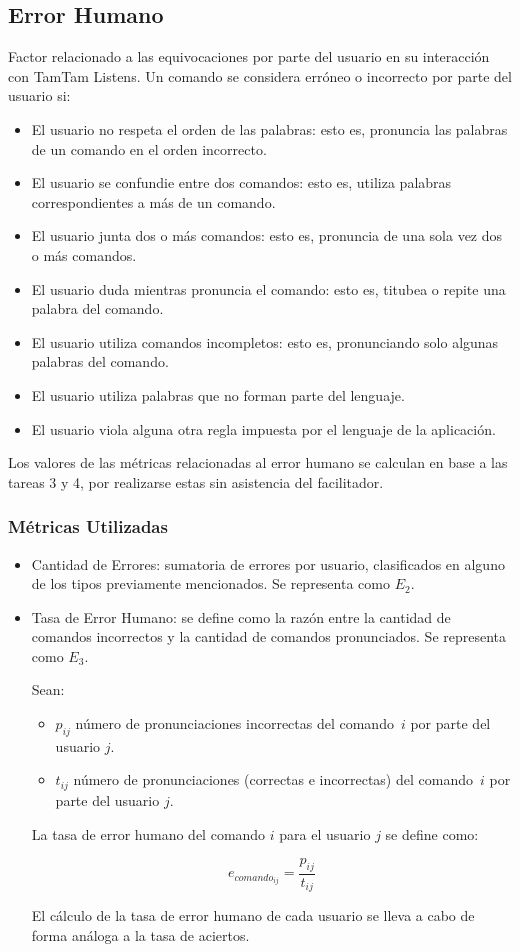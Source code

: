 \subsection{Error Humano}
Factor relacionado a las equivocaciones por parte del usuario en su interacci\'on con
TamTam Listens.
Un comando se considera err\'oneo o incorrecto por parte del usuario si:
\begin{itemize}
	\item El usuario no respeta el orden de las palabras: esto es, pronuncia las palabras de un comando en el orden incorrecto.
	\item El usuario se confundie entre dos comandos: esto es, utiliza palabras correspondientes a m\'as
	de un comando.
	\item El usuario junta dos o m\'as comandos: esto es, pronuncia de una sola vez dos o m\'as comandos.
	\item El usuario duda mientras pronuncia el comando: esto es, titubea o repite una palabra del comando.
	\item El usuario utiliza comandos incompletos: esto es, pronunciando solo algunas palabras del comando.
	\item El usuario utiliza palabras que no forman parte del lenguaje.
	\item El usuario viola alguna otra regla impuesta por el lenguaje de la aplicaci\'on.
\end{itemize}
Los valores de las m\'etricas relacionadas al error humano se calculan
en base a las tareas 3 y 4, por realizarse estas sin asistencia del facilitador. 

\subsubsection{M\'etricas Utilizadas}
\begin{itemize}
	\item Cantidad de Errores: sumatoria de errores por usuario, clasificados en
	alguno de los tipos previamente mencionados. Se representa como $E_2$.
	\item Tasa de Error Humano: se define como la raz\'on entre la cantidad de comandos incorrectos
	y la cantidad de comandos pronunciados. Se representa como $E_3$.
	
	Sean:

	\begin{itemize}
		\item $p_{ij}$ n\'umero de pronunciaciones incorrectas del \mbox{comando $i$} por parte del usuario $j$.
		\item $t_{ij}$ n\'umero de pronunciaciones (correctas e incorrectas) del \mbox{comando $i$} por parte del usuario $j$.
	\end{itemize}
	La tasa de error humano del comando $i$ para el usuario $j$ se define como: 

	\begin{equation*}
		e_{{comando}_{ij}}=\frac{p_{ij}}{t_{ij}}
	\end{equation*}

	El c\'alculo de la tasa de error humano de cada usuario se lleva a cabo de forma an\'aloga 
	a la tasa de aciertos.
\end{itemize}

